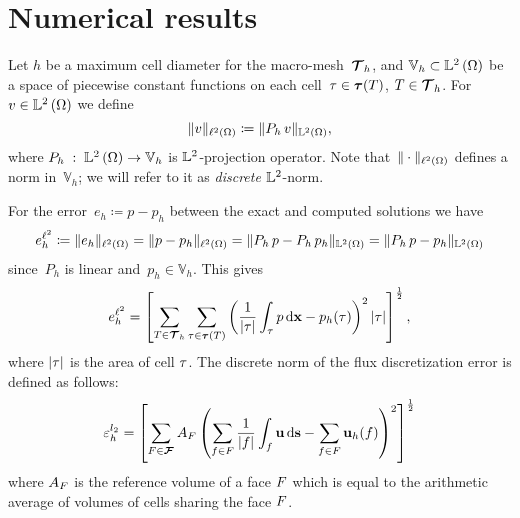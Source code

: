 \section{Numerical results}\label{sec:num}

Let $h$ be a maximum cell diameter for the macro-mesh~${\boldsymbol{\mathbf{\mathcal T}}}_h$, and $\mathbb V_h \subset {\mathbb L^2\left({\Omega}\right)}$ be a space of piecewise constant
functions on each cell~$\tau \in {\boldsymbol{\mathbf{\mathcal \tau}}}(T)$, $T \in {\boldsymbol{\mathbf{\mathcal T}}}_h$. For $v \in {\mathbb L^2\left({\Omega}\right)}$ we define
\begin{equation}\label{l2}
  \| v \|_{{\ell^2\left({\Omega}\right)}} \coloneqq \| P_h\,v \|_{{\mathbb L^2\left({\Omega}\right)}},
\end{equation}
where $P_h\;:\;{\mathbb L^2\left({\Omega}\right)}\rightarrow\mathbb V_h$ is ${\mathbb L^2}$-projection operator. Note that~$\| \cdot \|_{{\ell^2\left({\Omega}\right)}}$ defines a norm in~$\mathbb V_h$; we will refer to it as \textit{discrete} ${\mathbb L^2}$-norm.

For the error~$e_h \coloneqq p - p_h$ between the exact and computed solutions we have
\begin{equation}\label{l2norm}
	e^{{\ell^2}}_{h} \coloneqq \| e_h \|_{{\ell^2\left({\Omega}\right)}} = \| p - p_h \|_{{\ell^2\left({\Omega}\right)}} = \| P_h\,p - P_h\,p_h \|_{{\mathbb L^2\left({\Omega}\right)}} = \| P_h\,p - p_h \|_{{\mathbb L^2\left({\Omega}\right)}}
\end{equation}
since~$P_h$ is linear and~$p_h \in \mathbb V_h$. %
This gives
$$
	e^{{\ell^2}}_{h} = \left[\sum\limits_{T \in {\boldsymbol{\mathbf{\mathcal T}}}_h}\sum\limits_{\tau\in{\boldsymbol{\mathbf{\mathcal \tau}}}(T)} \left(\frac{1}{|\tau|}\int_{\tau} p \mathop{}\!\mathrm{d}{\boldsymbol{\mathbf{x}}} - p_h(\tau)\right)^2|\tau|\right]^\frac12,
$$
        where $|\tau|$ is the area of cell $\tau$. The discrete norm of the flux discretization error is defined as follows:
        $$
        \varepsilon_h^{l_2} =  \left[\sum\limits_{F \in {\boldsymbol{\mathbf{\mathcal F}}_{\text{}}}}
          A_F\left(
          \sum\limits_{f\in F}
          \frac{1}{|f|}\int_{f}
          \boldsymbol{\mathbf{u}} \mathop{}\!\mathrm{d}{\boldsymbol{\mathbf{s}}}  - \sum\limits_{f\in F}\boldsymbol{\mathbf{u}}_h(f)\right)^2
          \right]^\frac12
        $$
        where $A_F$ is the reference volume of a face $F$ which is equal to the arithmetic average
of volumes of cells sharing the face $F$.

